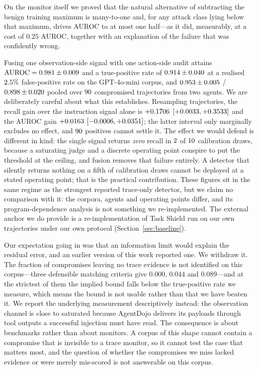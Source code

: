 \documentclass[preprint,12pt,authoryear]{elsarticle}
\theoremstyle{definition}
\begin{document}
On the monitor itself we proved that the natural alternative of subtracting the
benign training maximum is many-to-one and, for any attack class lying below that
maximum, drives AUROC to at most one half---as it did, measurably, at a cost of
$0.25$ AUROC, together with an explanation of the failure that was confidently
wrong.

Fusing one observation-side signal with one action-side audit attains
$\mathrm{AUROC} = 0.981 \pm 0.009$ and a true-positive rate of
$0.914 \pm 0.040$ at a realised $2.5\%$ false-positive rate on
the GPT-4o-mini corpus, and $0.953 \pm 0.005$ /
$0.898 \pm 0.020$ pooled over $90$ compromised trajectories from
two agents. We are deliberately careful about what this establishes. Resampling
trajectories, the recall gain over the instruction signal alone is $+0.1706$
$[+0.0033, +0.3533]$ and the AUROC gain $+0.0163$
$[-0.0006, +0.0351]$; the latter interval only marginally excludes
no effect, and $90$ positives cannot settle it. The effect we would defend is
different in kind: the single signal returns \emph{zero} recall in
$2$ of $10$ calibration draws, because a saturating judge and a
discrete operating point conspire to put the threshold at the ceiling, and fusion
removes that failure entirely. A detector that silently returns nothing on a fifth
of calibration draws cannot be deployed at a stated operating point; that is the
practical contribution. These figures sit in the same regime as the strongest
reported trace-only detector, but we claim no comparison with it: the corpora,
agents and operating points differ, and its program-dependence analysis is not
something we re-implemented. The external anchor we do provide is a
re-implementation of Task Shield run on our own trajectories under our own
protocol (Section~\ref{sec:baseline}).

Our expectation going in was that an information limit would explain the residual
error, and an earlier version of this work reported one. We withdraw it. The
fraction of compromises leaving no trace evidence is not identified on this
corpus---three defensible matching criteria give $0.000$, $0.044$ and $0.089$---and
at the strictest of them the implied bound falls below the true-positive rate we
measure, which means the bound is not usable rather than that we have beaten it. We
report the underlying measurement descriptively instead: the observation channel is
close to saturated because AgentDojo delivers its payloads through tool outputs a
successful injection must have read. The consequence is about benchmarks rather
than about monitors. A corpus of this shape cannot contain a compromise that is
invisible to a trace monitor, so it cannot test the case that matters most, and the
question of whether the compromises we miss lacked evidence or were merely
mis-scored is not answerable on this corpus.
\end{document}
